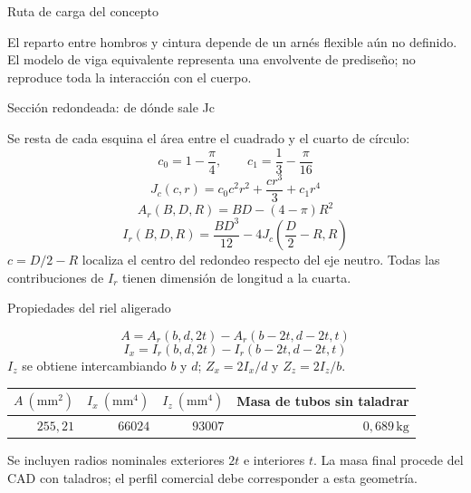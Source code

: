 \documentclass[10pt,aspectratio=169]{beamer}
\newcommand{\kg}{\,\mathrm{kg}}
\newcommand{\mcref}{Guía de diseño}
\begin{document}
\gdef\mcref{Guía de diseño}
\begin{frame}[t]{Ruta de carga del concepto}

\begin{center}\end{center}
El reparto entre hombros y cintura depende de un arnés flexible aún no definido. El modelo de viga equivalente representa una envolvente de prediseño; no reproduce toda la interacción con el cuerpo.

\end{frame}

\gdef\mcref{Mathcad: sección 4 / pág. 4}
\begin{frame}[t]{Sección redondeada: de dónde sale Jc}

Se resta de cada esquina el área entre el cuadrado y el cuarto de círculo:
\[
c_0=1-\frac\pi4,\qquad c_1=\frac13-\frac\pi{16}
\]
\[
J_c(c,r)=c_0c^2r^2+\frac{cr^3}{3}+c_1r^4
\]
\[
A_r(B,D,R)=BD-(4-\pi)R^2
\]
\[
I_r(B,D,R)=\frac{BD^3}{12}-4J_c\left(\frac D2-R,R\right)
\]
$c=D/2-R$ localiza el centro del redondeo respecto del eje neutro. Todas las contribuciones de $I_r$ tienen dimensión de longitud a la cuarta.

\end{frame}

\gdef\mcref{Mathcad: sección 5 / pág. 5}
\begin{frame}[t]{Propiedades del riel aligerado}

\[
A=A_r(b,d,2t)-A_r(b-2t,d-2t,t)
\]
\[
I_x=I_r(b,d,2t)-I_r(b-2t,d-2t,t)
\]
$I_z$ se obtiene intercambiando $b$ y $d$; $Z_x=2I_x/d$ y $Z_z=2I_z/b$.
\begin{center}\begin{tabular}{rrrr}\toprule
$A\ (\mathrm{mm^2})$ & $I_x\ (\mathrm{mm^4})$ & $I_z\ (\mathrm{mm^4})$ & Masa de tubos sin taladrar\\\midrule
$255{,}21$ & $66024$ & $93007$ & $0{,}689\kg$\\\bottomrule\end{tabular}\end{center}
Se incluyen radios nominales exteriores $2t$ e interiores $t$. La masa final procede del CAD con taladros; el perfil comercial debe corresponder a esta geometría.

\end{frame}
\end{document}
